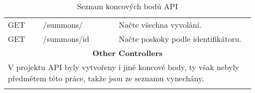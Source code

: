 \begin{longtable}{|l|l|p{}|}
    \hline
    GET             & /summons/                              & Načte všechna vyvolání.                                                                                                                    \\
    GET             & /summons/{id}                          & Načte poskoky podle identifikátoru.                                                                                                        \\
    \hline
    \multicolumn{3}{|c|}{\textbf{Other Controllers}}                                                                                                                                                      \\
    \multicolumn{3}{|m{\textwidth}|}{V projektu API byly vytvořeny i jiné koncové body, ty však nebyly předmětem této práce, takže jsou ze seznamu vynechány.}                                            \\
    \hline

    \caption{Seznam koncových bodů API}
    \label{tab:endpoints}
\end{longtable}